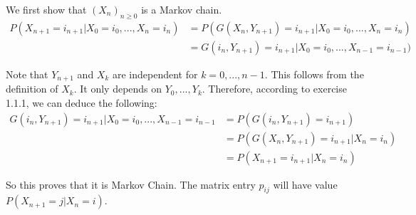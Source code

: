 
\beginproof
We first show that $(X_n)_{n\geq 0}$ is a Markov chain. 
\begin{align*}
P(X_{n+1} = i_{n+1} | X_0 = i_0,...,X_n=i_n) &= P( G(X_n,Y_{n+1}) = i_{n+1} | X_0 =i_0,...,X_n=i_n ) \\
&= G(i_n ,Y_{n+1}) = i_{n+1} | X_0 = i_0 ,...,X_{n-1}=i_{n-1})
\end{align*}

Note that $Y_{n+1}$ and $X_k$ are independent for $k=0,...,n-1$. This follows from the definition of $X_k$. It only depends on $Y_0,...,Y_k$. Therefore, according to exercise 1.1.1, we can deduce the following:
\begin{align*}
G(i_n ,Y_{n+1}) = i_{n+1} | X_0 = i_0 ,...,X_{n-1}=i_{n-1} & = P(G(i_n,Y_{n+1})=i_{n+1}) \\
&= P (G(X_n, Y_{n+1}) = i_{n+1} | X_n = i_n) \\
&= P (X_{n+1} =i_{n+1} | X_n = i_n)
\end{align*}

So this proves that it is Markov Chain. The matrix entry $p_{ij}$ will have value $P (X_{n+1} =j | X_n = i)$.
\endproof